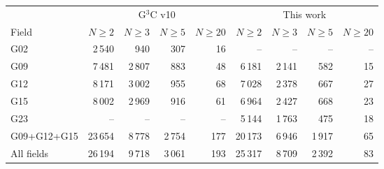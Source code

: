 \begin{tabular}{lrrrrrrrr}
\hline
 & \multicolumn{4}{c}{G$^3$C v10} & \multicolumn{4}{c}{This work} \\
Field & $N \geq 2$ & $N \geq 3$ & $N \geq 5$ & $N \geq 20$ & $N \geq 2$ & $N \geq 3$ & $N \geq 5$ & $N \geq 20$ \\
\hline
G02 & 2\,540 & 940 & 307 & 16 & -- & -- & -- & -- \\
G09 & 7\,481 & 2\,807 & 883 & 48 & 6\,181 & 2\,141 & 582 & 15 \\
G12 & 8\,171 & 3\,002 & 955 & 68 & 7\,028 & 2\,378 & 667 & 27 \\
G15 & 8\,002 & 2\,969 & 916 & 61 & 6\,964 & 2\,427 & 668 & 23 \\
G23 & -- & -- & -- & -- & 5\,144 & 1\,763 & 475 & 18 \\
\hline
G09+G12+G15 & 23\,654 & 8\,778 & 2\,754 & 177 & 20\,173 & 6\,946 & 1\,917 & 65 \\
All fields & 26\,194 & 9\,718 & 3\,061 & 193 & 25\,317 & 8\,709 & 2\,392 & 83 \\
\hline
\end{tabular}
